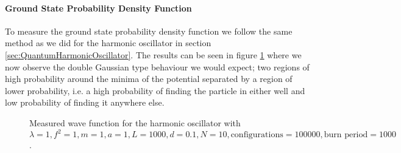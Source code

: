 \documentclass[12pt]{article}
\begin{document}
            \paragraph{Ground State Probability Density Function}
                To measure the ground state probability density function we follow the same method as we did for the harmonic oscillator in section \ref{sec:QuantumHarmonicOscillator}. The results can be seen in figure \ref{fig:AnharmonicWaveFunction} where we now observe the double Gaussian type behaviour we would expect; two regions of high probability around the minima of the potential separated by a region of lower probability, i.e. a high probability of finding the particle in either well and low probability of finding it anywhere else.
                \begin{figure}
                    \centering
                    \caption{Measured wave function for the harmonic oscillator with $\lambda = 1, f^2=1,  m = 1, a = 1, L = 1000, d = 0.1, N = 10, \text{configurations} = 100000, \text{burn period} = 1000$.}
                    \label{fig:AnharmonicWaveFunction}
                \end{figure}
\end{document}
